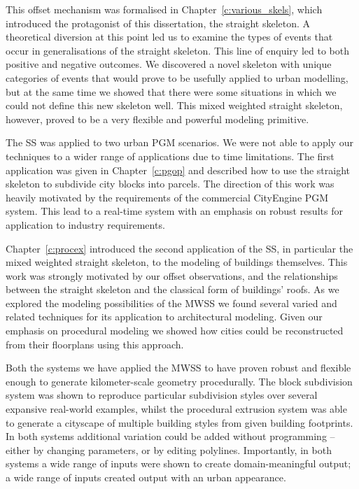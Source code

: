 This offset mechanism was formalised in Chapter~\ref{c:various_skels}, which introduced the protagonist of this dissertation, the straight skeleton. A theoretical diversion at this point led us to examine the types of events that occur in generalisations of the straight skeleton. This line of enquiry led to both positive and negative outcomes. We discovered a novel skeleton with unique categories of events that would prove to be usefully applied to urban modelling, but at the same time we showed that there were some situations in which we could not define this new skeleton well. This mixed weighted straight skeleton, however, proved to be a very flexible and powerful modeling primitive.

The SS was applied to two urban PGM scenarios. We were not able to apply our techniques to a wider range of applications due to time limitations. The first application was given in Chapter~\ref{c:pgop} and described how to use the straight skeleton to subdivide city blocks into parcels. The direction of this work was heavily motivated by the requirements of the commercial CityEngine PGM system. This lead to a real-time system with an emphasis on robust results for application to industry requirements.

Chapter~\ref{c:procex} introduced the second application of the SS, in particular the mixed weighted straight skeleton, to the modeling of buildings themselves. This work was strongly motivated by our offset observations, and the relationships between the straight skeleton and the classical form of buildings' roofs. As we explored the modeling possibilities of the MWSS we found several varied and related techniques for its application to architectural modeling. Given our emphasis on procedural modeling we showed how cities could be reconstructed from their floorplans using this approach.


Both the systems we have applied the MWSS to have proven robust and flexible enough to generate kilometer-scale geometry procedurally. The block subdivision system was shown to reproduce particular subdivision styles over several expansive real-world examples, whilst the procedural extrusion system was able to generate a cityscape of multiple building styles from given building footprints. In both systems additional variation could be added without programming -- either by changing parameters, or by editing polylines. Importantly, in both systems a wide range of inputs were shown to create domain-meaningful output; a wide range of inputs created output with an urban appearance. 

